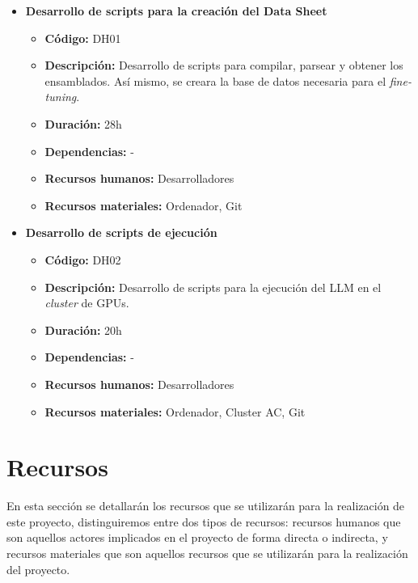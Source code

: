 
\begin{itemize}
    \item \textbf{Desarrollo de scripts para la creación del Data Sheet}
        \begin{itemize}
            \item \textbf{Código:} DH01
            \item \textbf{Descripción:} Desarrollo de scripts para compilar, parsear y obtener los ensamblados. Así mismo, se creara la base de datos
                necesaria para el \textit{fine-tuning}.
            \item \textbf{Duración:} 28h
            \item \textbf{Dependencias:} -
            \item \textbf{Recursos humanos:} Desarrolladores
            \item \textbf{Recursos materiales:} Ordenador, Git
        \end{itemize}
    \item \textbf{Desarrollo de scripts de ejecución}
        \begin{itemize}
            \item \textbf{Código:} DH02
            \item \textbf{Descripción:} Desarrollo de scripts para la ejecución del LLM en el \textit{cluster} de GPUs.
            \item \textbf{Duración:} 20h
            \item \textbf{Dependencias:} -
            \item \textbf{Recursos humanos:} Desarrolladores
            \item \textbf{Recursos materiales:} Ordenador, Cluster AC, Git
        \end{itemize}
\end{itemize}

\section{Recursos}
\label{subsec:recursos}


En esta sección se detallarán los recursos que se utilizarán para la realización
de este proyecto, distinguiremos entre dos tipos de recursos: recursos humanos que
son aquellos actores implicados en el proyecto de forma directa o indirecta, y
recursos materiales que son aquellos recursos que se utilizarán para la realización
del proyecto.


